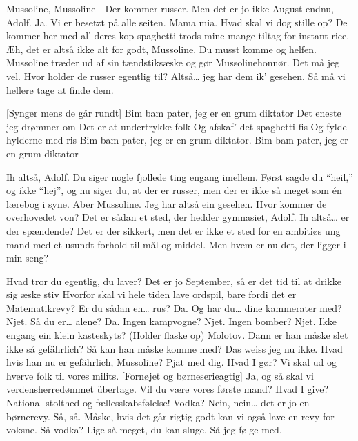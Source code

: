 \documentclass[a4paper,11pt]{article}
\begin{document}
\begin{sketch}



 Mussoline, Mussoline - Der kommer russer.
 Men det er jo ikke August endnu, Adolf.
 Ja. Vi er besetzt på alle seiten.
 Mama mia. Hvad skal vi dog stille op? De kommer her med al’ deres kop-spaghetti trods mine mange tiltag for instant rice.
 Æh, det er altså ikke alt for godt, Mussoline. Du musst komme og helfen.
Mussoline træder ud af sin tændstiksæske og gør Mussolinehonnør.
 Det må jeg vel. Hvor holder de russer egentlig til?
 Altså… jeg har dem ik’ gesehen.
 Så må vi hellere tage at finde dem.

[Synger mens de går rundt] Bim bam pater, jeg er en grum diktator
Det eneste jeg drømmer om
Det er at undertrykke folk
Og afskaf’ det spaghetti-fis
Og fylde hylderne med ris
Bim bam pater, jeg er en grum diktator.
Bim bam pater, jeg er en grum diktator
 

 Ih altså, Adolf. Du siger nogle fjollede ting engang imellem. Først sagde du “heil,” og ikke “hej”, og nu siger du, at der er russer, men der er ikke så meget som én lærebog i syne.
 Aber Mussoline. Jeg har altså ein gesehen.  Hvor kommer de overhovedet von?
 Det er sådan et sted, der hedder gymnasiet, Adolf.
 Ih altså… er der spændende?
 Det er der sikkert, men det er ikke et sted for en ambitiøs ung mand med et usundt forhold til mål og middel. Men hvem er nu det, der ligger i min seng? 


 Hvad tror du egentlig, du laver? 
 Det er jo September, så er det tid til at drikke sig æske stiv
 Hvorfor skal vi hele tiden lave ordspil, bare fordi det er Matematikrevy?
 Er du sådan en… rus?
 Da.
 Og har du… dine kammerater med?
 Njet.
 Så du er… alene?
 Da.
 Ingen kampvogne?
 Njet.
 Ingen bomber?
 Njet.
 Ikke engang ein klein kasteskyts?
 (Holder flaske op) Molotov.
 Dann er han måske slet ikke så gefährlich?
 Så kan han måske komme med?
 Das weiss jeg nu ikke. Hvad hvis han nu er gefährlich, Mussoline?
 Pjat med dig.
 Hvad I gør?
 Vi skal ud og hverve folk til vores milits.
[Fornøjet og børneserieagtig] Ja, og så skal vi verdensherredømmet übertage.
 Vil du være vores første mand?
 Hvad I give?
 National stolthed og fællesskabsfølelse!
 Vodka?
 Nein, nein… det er jo en børnerevy.
 
 Så, så. Måske, hvis det går rigtig godt kan vi også lave en revy for voksne.
  Så vodka?
 Lige så meget, du kan sluge.
 Så jeg følge med.


\end{sketch}
\end{document}
